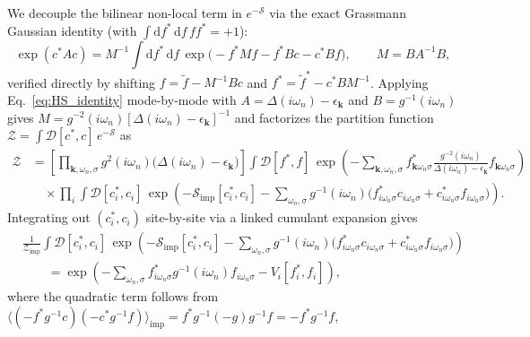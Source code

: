 \documentclass[11pt,a4paper]{article}
\numberwithin{equation}{section}
\theoremstyle{plain}
\theoremstyle{definition}
\providecommand{\vk}{\mathbf{k}}
\providecommand{\dd}{\mathrm{d}}
\begin{document}
We decouple the bilinear non-local term in $e^{-\mathcal{S}}$ via the exact Grassmann
Gaussian identity (with $\int \dd f^*\,\dd f\, f f^* = +1$):
\begin{equation}
    \exp(c^* A c)
    = M^{-1} \int \dd f^*\, \dd f\,
      \exp\bigl(-f^* M f - f^* B c - c^* B f\bigr),
    \qquad M = B A^{-1} B,
    \label{eq:HS_identity}
\end{equation}
verified directly by shifting $f = \tilde{f} - M^{-1} B c$ and
$f^* = \tilde{f}^* - c^* B M^{-1}$. Applying Eq.~\eqref{eq:HS_identity} mode-by-mode
with $A = \Delta(i\omega_n) - \epsilon_{\vk}$ and $B = g^{-1}(i\omega_n)$ gives
$M = g^{-2}(i\omega_n)[\Delta(i\omega_n) - \epsilon_{\vk}]^{-1}$ and factorizes the
partition function $\mathcal{Z} = \int \mathcal{D}[c^*,c]\, e^{-\mathcal{S}}$ as
\begin{equation}
\begin{split}
    \mathcal{Z} &= \left[ \prod_{\vk,\omega_n,\sigma} g^2(i\omega_n)
         \bigl(\Delta(i\omega_n) - \epsilon_{\vk}\bigr) \right]
         \int \mathcal{D}[f^*,f]\,
         \exp\!\left( -\sum_{\vk,\omega_n,\sigma} f^*_{\vk\omega_n\sigma}
         \frac{g^{-2}(i\omega_n)}{\Delta(i\omega_n) - \epsilon_{\vk}}
         f_{\vk\omega_n\sigma} \right) \\
      &\quad \times \prod_{i} \int \mathcal{D}[c^*_i, c_i]\,
         \exp\!\left( -\mathcal{S}_{\mathrm{imp}}[c^*_i,c_i]
         - \sum_{\omega_n,\sigma} g^{-1}(i\omega_n)
         \bigl( f^*_{i\omega_n\sigma} c_{i\omega_n\sigma}
         + c^*_{i\omega_n\sigma} f_{i\omega_n\sigma} \bigr) \right).
\end{split}
\label{eq:Z_factorized}
\end{equation}
Integrating out $(c^*_i, c_i)$ site-by-site via a linked cumulant expansion gives
\begin{equation}
\begin{split}
    &\frac{1}{\mathcal{Z}_{\mathrm{imp}}} \int \mathcal{D}[c^*_i, c_i]\,
    \exp\!\left( -\mathcal{S}_{\mathrm{imp}}[c^*_i,c_i]
    - \sum_{\omega_n,\sigma} g^{-1}(i\omega_n)
    \bigl( f^*_{i\omega_n\sigma} c_{i\omega_n\sigma}
    + c^*_{i\omega_n\sigma} f_{i\omega_n\sigma} \bigr) \right) \\
    &\qquad = \exp\!\left( -\sum_{\omega_n,\sigma}
    f^*_{i\omega_n\sigma} g^{-1}(i\omega_n) f_{i\omega_n\sigma}
    - V_i[f^*_i, f_i] \right),
\end{split}
\label{eq:cumulant}
\end{equation}
where the quadratic term follows from
$\langle (-f^* g^{-1} c)(-c^* g^{-1} f)\rangle_{\mathrm{imp}} = f^* g^{-1}(-g)g^{-1}f = -f^* g^{-1} f$,
\end{document}
